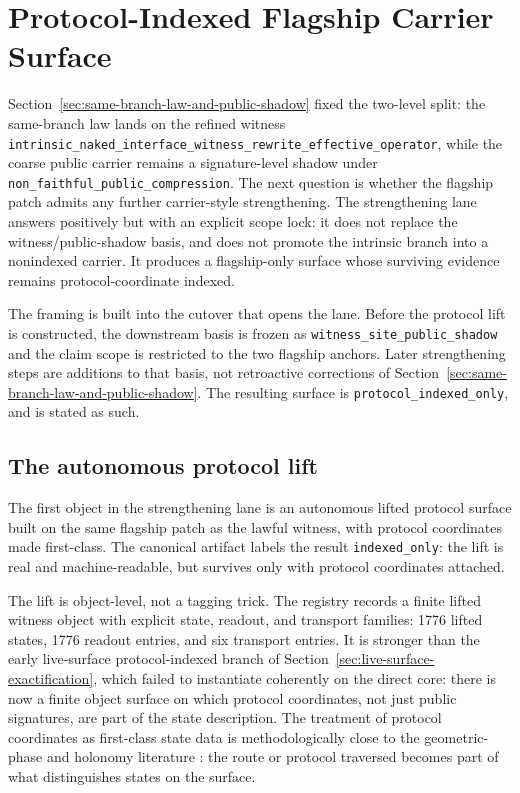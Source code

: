 \documentclass[11pt]{article}
\theoremstyle{definition}
\begin{document}
 \section{Protocol-Indexed Flagship Carrier Surface}
\label{sec:protocol-indexed-flagship-carrier}

Section~\ref{sec:same-branch-law-and-public-shadow} fixed the two-level split: the
same-branch law lands on the refined witness
\nolinkurl{intrinsic_naked_interface_witness_rewrite_effective_operator}, while the
coarse public carrier remains a signature-level shadow under
\nolinkurl{non_faithful_public_compression}. The next question is whether the flagship
patch admits any further carrier-style strengthening. The strengthening lane answers
positively but with an explicit scope lock: it does not replace the witness/public-shadow
basis, and does not promote the intrinsic branch into a nonindexed carrier. It produces
a flagship-only surface whose surviving evidence remains protocol-coordinate indexed.

The framing is built into the cutover that opens the lane. Before the protocol lift is
constructed, the downstream basis is frozen as \texttt{witness\_site\_public\_shadow}
and the claim scope is restricted to the two flagship anchors. Later strengthening
steps are additions to that basis, not retroactive corrections of
Section~\ref{sec:same-branch-law-and-public-shadow}. The resulting surface is
\texttt{protocol\_indexed\_only}, and is stated as such.

\subsection{The autonomous protocol lift}

The first object in the strengthening lane is an autonomous lifted protocol surface
built on the same flagship patch as the lawful witness, with protocol coordinates made
first-class. The canonical artifact labels the result \texttt{indexed\_only}: the lift
is real and machine-readable, but survives only with protocol coordinates attached.

The lift is object-level, not a tagging trick. The registry records a finite lifted
witness object with explicit state, readout, and transport families: 1776 lifted states,
1776 readout entries, and six transport entries. It is stronger than the early
live-surface protocol-indexed branch of
Section~\ref{sec:live-surface-exactification}, which failed to instantiate coherently
on the direct core: there is now a finite object surface on which protocol
coordinates, not just public signatures, are part of the state description. The
treatment of protocol coordinates as first-class state data is methodologically close
to the geometric-phase and holonomy literature
\citep{Berry1984,Simon1983,AharonovAnandan1987}: the route or protocol traversed
becomes part of what distinguishes states on the surface.
\end{document}

